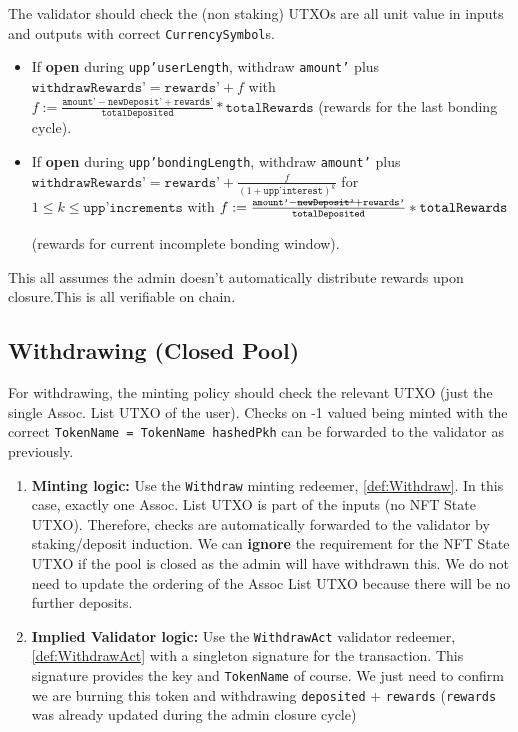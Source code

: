 \documentclass[10pt, a4paper]{article}
\theoremstyle{definition}
\begin{document}
\begin{enumerate}
{The validator should check the (non staking) UTXOs are all unit value in inputs and outputs with correct \texttt{CurrencySymbol}s.

\begin{itemize}
\item{If \textbf{open} during \texttt{upp'userLength}, withdraw \texttt{amount'} plus \\ $\texttt{withdrawRewards'} = \texttt{rewards'} + f$
 with $f := \frac{\texttt{amount'} - \texttt{newDeposit'} + \texttt{rewards'}}{\texttt{totalDeposited}} * \texttt{totalRewards}$ (rewards for the last bonding cycle).}
\item{If \textbf{open} during \texttt{upp'bondingLength}, withdraw \texttt{amount'} plus \\ $\texttt{withdrawRewards'} = \texttt{rewards'} + \frac{f}{(1 + \texttt{upp'interest})^k}$ for $1 \le k \le \texttt{upp'increments}$
 with $f := \frac{\texttt{amount'} - \st{\texttt{newDeposit'}} + \texttt{rewards'}}{\texttt{totalDeposited}} * \texttt{totalRewards}$

 (rewards for current incomplete bonding window).}
\end{itemize}


This all assumes the admin doesn't automatically distribute rewards upon closure.This is all verifiable on chain.
}
\end{enumerate}

\subsection{Withdrawing (\textbf{Closed Pool})}\label{subsection:WithdrawingClosed}

For withdrawing, the minting policy should check the relevant UTXO (just the single Assoc. List UTXO of the user). Checks on -1 valued being minted with the correct \texttt{TokenName = TokenName hashedPkh} can be forwarded to the validator as previously.

\begin{enumerate}
\item{\textbf{Minting logic:} Use the \texttt{Withdraw} minting redeemer, \ref{def:Withdraw}. In this case, exactly one Assoc. List UTXO is part of the inputs (no NFT State UTXO). Therefore, checks are automatically forwarded to the validator by staking/deposit induction. We can \textbf{ignore} the requirement for the NFT State UTXO if the pool is closed as the admin will have withdrawn this. We do not need to update the ordering of the Assoc List UTXO because there will be no further deposits. }
\item{\textbf{Implied Validator logic:} Use the \texttt{WithdrawAct} validator redeemer, \ref{def:WithdrawAct} with a singleton signature for the transaction. This signature provides the key and \texttt{TokenName} of course. We just need to confirm we are burning this token and withdrawing \texttt{deposited} + \texttt{rewards} (\texttt{rewards} was already updated during the admin closure cycle)}

\end{enumerate}
\end{document}
